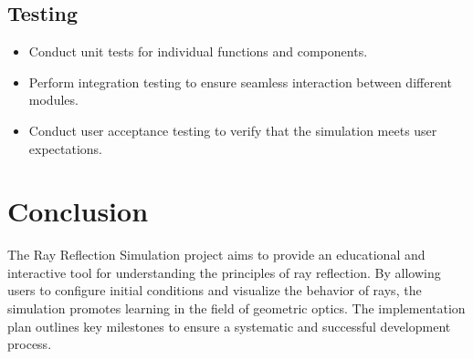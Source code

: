 \documentclass{article}
\begin{document}
\subsection{Testing}

\begin{itemize}
    \item Conduct unit tests for individual functions and components.
    \item Perform integration testing to ensure seamless interaction between different modules.
    \item Conduct user acceptance testing to verify that the simulation meets user expectations.
\end{itemize}

\section{Conclusion}

The Ray Reflection Simulation project aims to provide an educational and interactive tool for understanding the principles of ray reflection. By allowing users to configure initial conditions and visualize the behavior of rays, the simulation promotes learning in the field of geometric optics. The implementation plan outlines key milestones to ensure a systematic and successful development process.
\end{document}

